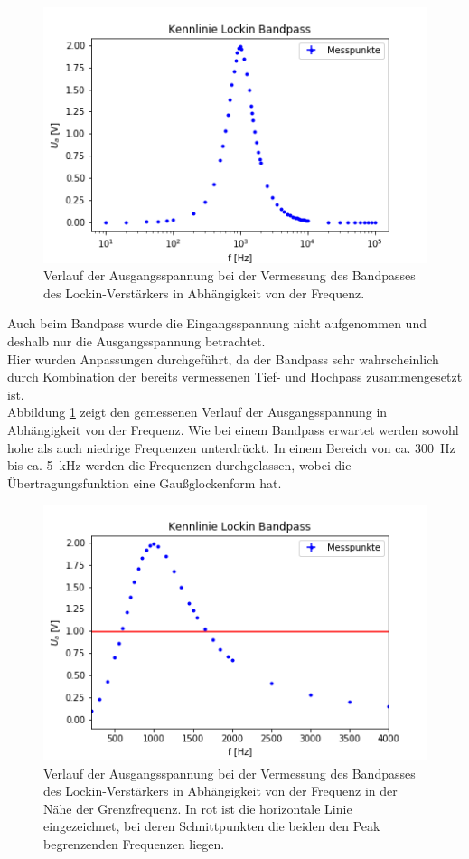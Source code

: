 \documentclass[12pt,a4paper]{article}
\begin{document}
\begin{figure}
\centering
\includegraphics[scale=1]{Bilder/Vorversuch2/KennlinieBandpass.png}
\caption[test]{Verlauf der Ausgangsspannung bei der Vermessung des Bandpasses des Lockin-Verstärkers in Abhängigkeit von der Frequenz.}
\label{fig:LockinBandpass_Verlauf}
\end{figure}

Auch beim Bandpass wurde die Eingangsspannung nicht aufgenommen und deshalb nur die Ausgangsspannung betrachtet. \\
Hier wurden Anpassungen durchgeführt, da der Bandpass sehr wahrscheinlich durch Kombination der bereits vermessenen Tief- und Hochpass zusammengesetzt ist. \\
Abbildung \ref{fig:LockinBandpass_Verlauf} zeigt den gemessenen Verlauf der Ausgangsspannung in Abhängigkeit von der Frequenz. Wie bei einem Bandpass erwartet werden sowohl hohe als auch niedrige Frequenzen unterdrückt. In einem Bereich von ca. \SI{300}{Hz} bis ca. \SI{5}{kHz} werden die Frequenzen durchgelassen, wobei die Übertragungsfunktion eine Gaußglockenform hat.

\begin{figure}
\centering
\includegraphics[scale=1]{Bilder/Vorversuch2/AblesenBandpass.png}
\caption[test]{Verlauf der Ausgangsspannung bei der Vermessung des Bandpasses des Lockin-Verstärkers in Abhängigkeit von der Frequenz in der Nähe der Grenzfrequenz. In rot ist die horizontale Linie eingezeichnet, bei deren Schnittpunkten die beiden den Peak begrenzenden Frequenzen liegen.}
\label{fig:LockinBandpass_Ablesen}
\end{figure}
\end{document}
